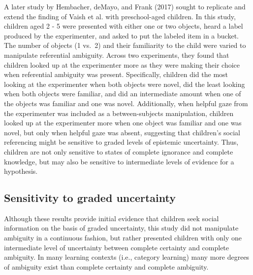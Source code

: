 \documentclass[floatsintext,man]{apa6}
\theoremstyle{definition}
\theoremstyle{definition}
\theoremstyle{definition}
\theoremstyle{remark}
\begin{document}
A later study by Hembacher, deMayo, and Frank (2017) sought to replicate
and extend the finding of Vaish et al. with preschool-aged children. In
this study, children aged 2 - 5 were presented with either one or two
objects, heard a label produced by the experimenter, and asked to put
the labeled item in a bucket. The number of objects (1 vs.~2) and their
familiarity to the child were varied to manipulate referential
ambiguity. Across two experiments, they found that children looked up at
the experimenter more as they were making their choice when referential
ambiguity was present. Specifically, children did the most looking at
the experimenter when both objects were novel, did the least looking
when both objects were familiar, and did an intermediate amount when one
of the objects was familiar and one was novel. Additionally, when
helpful gaze from the experimenter was included as a between-subjects
manipulation, children looked up at the experimenter more when one
object was familiar and one was novel, but only when helpful gaze was
absent, suggesting that children's social referencing might be sensitive
to graded levels of epistemic uncertainty. Thus, children are not only
sensitive to states of complete ignorance and complete knowledge, but
may also be sensitive to intermediate levels of evidence for a
hypothesis.

\subsection{Sensitivity to graded
uncertainty}\label{sensitivity-to-graded-uncertainty}

Although these results provide initial evidence that children seek
social information on the basis of graded uncertainty, this study did
not manipulate ambiguity in a continuous fashion, but rather presented
children with only one intermediate level of uncertainty between
complete certainty and complete ambiguity. In many learning contexts
(i.e., category learning) many more degrees of ambiguity exist than
complete certainty and complete ambiguity.
\end{document}
